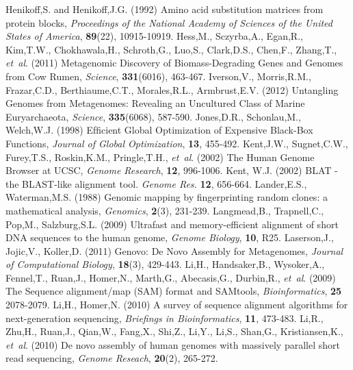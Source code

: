 \documentclass[phd,tocprelim]{cornell}
\begin{document}
\begin{thebibliography}{}
    Henikoff,S. and Henikoff,J.G. (1992) Amino acid substitution matrices from protein blocks, {\it Proceedings of the National Academy of Sciences of the United States of America}, {\bf 89}(22), 10915-10919.
 Hess,M., Sczyrba,A., Egan,R., Kim,T.W., Chokhawala,H., Schroth,G., Luo,S., Clark,D.S., Chen,F., Zhang,T., {\it et~al}. (2011) Metagenomic Discovery of Biomass-Degrading Genes and Genomes from Cow Rumen, {\it Science}, {\bf 331}(6016), 463-467.
 Iverson,V., Morris,R.M., Frazar,C.D., Berthiaume,C.T., Morales,R.L., Armbrust,E.V. (2012) Untangling Genomes from Metagenomes: Revealing an Uncultured Class of Marine Euryarchaeota, {\it Science}, {\bf 335}(6068), 587-590.
 Jones,D.R., Schonlau,M., Welch,W.J. (1998) Efﬁcient Global Optimization of Expensive Black-Box Functions, {\it Journal of Global Optimization}, {\bf 13}, 455-492.
 Kent,J.W., Sugnet,C.W., Furey,T.S., Roskin,K.M., Pringle,T.H., {\it et~al}. (2002) The Human Genome Browser at UCSC, {\it Genome Research}, {\bf 12}, 996-1006.
 Kent, W.J. (2002) BLAT - the BLAST-like alignment tool. \textit{Genome Res.} \textbf{12}, 656-664.
 Lander,E.S., Waterman,M.S. (1988) Genomic mapping by fingerprinting random clones: a mathematical analysis, {\it Genomics}, {\bf 2}(3), 231-239.
 Langmead,B., Trapnell,C., Pop,M., Salzburg,S.L. (2009) Ultrafast and memory-efficient alignment of short DNA sequences to the human genome, {\it Genome Biology}, {\bf 10}, R25.
 Laserson,J., Jojic,V., Koller,D. (2011) Genovo: De Novo Assembly for Metagenomes, {\it Journal of Computational Biology}, {\bf 18}(3), 429-443.
 Li,H., Handsaker,B., Wysoker,A., Fennel,T., Ruan,J., Homer,N., Marth,G., Abecasis,G., Durbin,R., {\it et~al}. (2009) The Sequence alignment/map (SAM) format and SAMtools, {\it Bioinformatics}, {\bf 25} 2078-2079.
 Li,H., Homer,N. (2010) A survey of sequence alignment algorithms for next-generation sequencing, {\it Briefings in Bioinformatics}, {\bf 11}, 473-483.
 Li,R., Zhu,H., Ruan,J., Qian,W., Fang,X., Shi,Z., Li,Y., Li,S., Shan,G., Kristiansen,K., {\it et~al}. (2010) De novo assembly of human genomes with massively parallel short read sequencing, {\it Genome Reseach}, {\bf 20}(2), 265-272.

\end{thebibliography}
\end{document}

